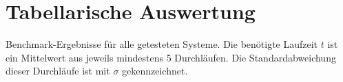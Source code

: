 
\section{Tabellarische Auswertung}

\begin{table}[H]
\caption{Benchmark-Ergebnisse für alle getesteten Systeme. Die benötigte Laufzeit $t$ ist ein Mittelwert aus jeweils mindestens 5 Durchläufen. Die Standardabweichung dieser Durchläufe ist mit $\sigma$ gekennzeichnet.}
\label{tab:performance_comparison}
\begin{adjustbox}{max width=\textwidth}
\renewcommand{\arraystretch}{1.5}

\end{adjustbox}
\end{table}
